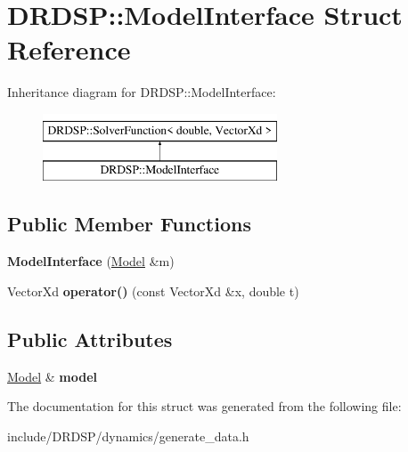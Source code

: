 \hypertarget{struct_d_r_d_s_p_1_1_model_interface}{\section{D\-R\-D\-S\-P\-:\-:Model\-Interface Struct Reference}
\label{struct_d_r_d_s_p_1_1_model_interface}
}
Inheritance diagram for D\-R\-D\-S\-P\-:\-:Model\-Interface\-:\begin{figure}[H]
\begin{center}
\leavevmode
\includegraphics[height=2.000000cm]{struct_d_r_d_s_p_1_1_model_interface}
\end{center}
\end{figure}
\subsection*{Public Member Functions}
\begin{DoxyCompactItemize}
\item 
\hypertarget{struct_d_r_d_s_p_1_1_model_interface_ac14844dbb4d85776d5722b5f5703a6c6}{{\bfseries Model\-Interface} (\hyperlink{struct_d_r_d_s_p_1_1_model}{Model} \&m)}\label{struct_d_r_d_s_p_1_1_model_interface_ac14844dbb4d85776d5722b5f5703a6c6}

\item 
\hypertarget{struct_d_r_d_s_p_1_1_model_interface_aa62fa799b797bb964b20dc62a64f507e}{Vector\-Xd {\bfseries operator()} (const Vector\-Xd \&x, double t)}\label{struct_d_r_d_s_p_1_1_model_interface_aa62fa799b797bb964b20dc62a64f507e}

\end{DoxyCompactItemize}
\subsection*{Public Attributes}
\begin{DoxyCompactItemize}
\item 
\hypertarget{struct_d_r_d_s_p_1_1_model_interface_a2a74d38144a22d3f12184a88ac3fb147}{\hyperlink{struct_d_r_d_s_p_1_1_model}{Model} \& {\bfseries model}}\label{struct_d_r_d_s_p_1_1_model_interface_a2a74d38144a22d3f12184a88ac3fb147}

\end{DoxyCompactItemize}


The documentation for this struct was generated from the following file\-:\begin{DoxyCompactItemize}
\item 
include/\-D\-R\-D\-S\-P/dynamics/generate\-\_\-data.\-h\end{DoxyCompactItemize}
